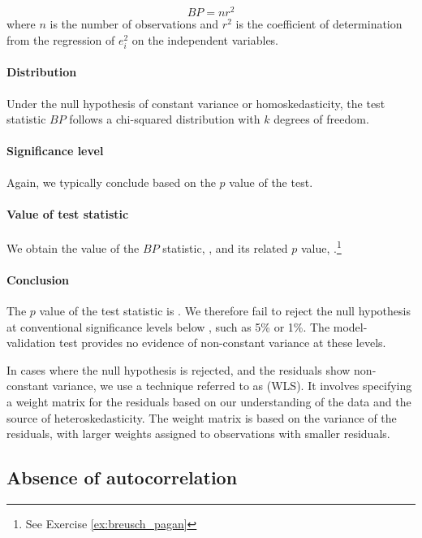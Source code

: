 \begin{equation}
  BP = nr^2
\end{equation}
where $n$ is the number of observations and $r^2$ is the coefficient of determination from the regression of $e_i^2$ on the independent variables.

\paragraph{Distribution} Under the null hypothesis of constant variance or homo\-skedasticity, the test statistic $BP$ follows a chi-squared distribution with $k$ degrees of freedom.

\paragraph{Significance level} Again, we typically conclude based on the $p$ value of the test.

\paragraph{Value of test statistic} We obtain the value of the $BP$ statistic, \RegModThreeBp, and its related $p$ value, \RegModThreeBpP.\footnote{See Exercise \ref{ex:breusch_pagan}}

\paragraph{Conclusion}

The $p$ value of the test statistic is \RegModThreeBpP. We therefore fail to reject the null hypothesis at conventional significance levels below \RegModThreeBpP, such as 5\% or 1\%. The model-validation test provides no evidence of non-constant variance at these levels.

\bigskip
In cases where the null hypothesis is rejected, and the residuals show non-constant variance, we use a technique referred to as  (WLS). It involves specifying a weight matrix for the residuals based on our understanding of the data and the source of heteroskedasticity. The weight matrix is based on the variance of the residuals, with larger weights assigned to observations with smaller residuals. 


\subsection{Absence of autocorrelation} %
\label{sub:absence_of_autocorrelation}

